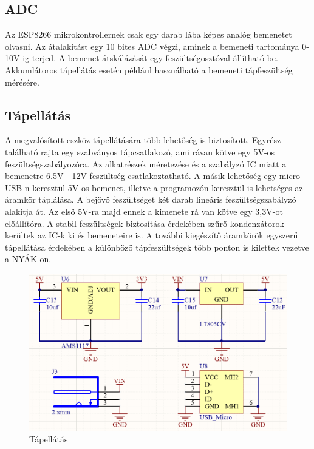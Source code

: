 \subsection{ADC}
Az ESP8266 mikrokontrollernek csak egy darab lába képes analóg bemenetet olvasni. Az átalakítást egy 10 bites ADC végzi, aminek a bemeneti tartománya 0-10V-ig terjed. A bemenet átskálázását egy feszültségosztóval állítható be. Akkumlátoros tápellátás esetén például használható a bemeneti tápfeszültség mérésére.

\subsection{Tápellátás}
A megvalósított eszköz tápellátására több lehetőség is biztosított. Egyrész található rajta egy szabványos tápcsatlakozó, ami rávan kötve egy 5V-os feszültségszabályozóra. Az alkatrészek méretezése és a szabályzó IC miatt a bemenetre 6.5V - 12V feszültség csatlakoztatható. A másik lehetőség egy micro USB-n keresztül 5V-os bemenet, illetve a programozón keresztül is lehetséges az áramkör táplálása. A bejövő feszültséget két darab lineáris feszültségszabályzó alakítja át. Az első 5V-ra majd ennek a kimenete rá van kötve egy 3,3V-ot előállítóra. A stabil feszültségek biztosítása érdekében szűrő kondenzátorok kerültek az IC-k ki és bemeneteire is. A további kiegészítő áramkörök egyszerű tápellátása érdekében a különböző tápfeszültségek több ponton is kilettek vezetve a NYÁK-on.

\begin{figure}[!ht]
    \centering
    \includegraphics[width=130mm, keepaspectratio]{figures/power.png}
    \caption{Tápellátás}
    \label{fig:TeXstudio}
\end{figure}



